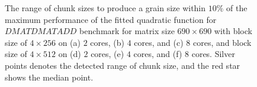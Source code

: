 \begin{figure}[H]
	\hfill
	\caption{The range of chunk sizes to produce a grain size within $10\%$ of the maximum performance of the fitted quadratic function for $DMATDMATADD$ benchmark for matrix size $690\times690$ with block size of $4\times256$ on (a) $2$ cores, (b) $4$ cores, and (c) $8$ cores, and block size of $4\times512$ on (d) $2$ cores, (e) $4$ cores, and (f) $8$ cores. Silver points denotes the detected range of chunk size, and the red star shows the median point.}	
	\label{fig14}
\end{figure}


